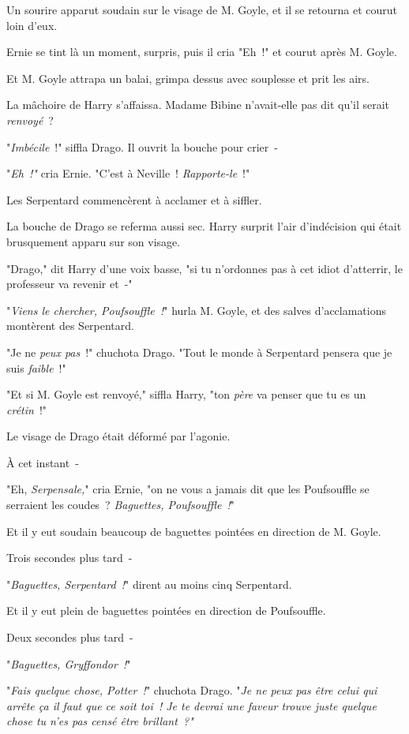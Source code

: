 Un sourire apparut soudain sur le visage de M. Goyle, et il se retourna et courut loin d'eux.

Ernie se tint là un moment, surpris, puis il cria "Eh~!" et courut après M. Goyle.

Et M. Goyle attrapa un balai, grimpa dessus avec souplesse et prit les airs.

La mâchoire de Harry s'affaissa. Madame Bibine n'avait-elle pas dit qu'il serait \emph{renvoyé}~?

"\emph{Imbécile}~!" siffla Drago. Il ouvrit la bouche pour crier~-

"\emph{Eh~!"} cria Ernie. "C'est à Neville~! \emph{Rapporte-le}~!"

Les Serpentard commencèrent à acclamer et à siffler.

La bouche de Drago se referma aussi sec. Harry surprit l'air d'indécision qui était brusquement apparu sur son visage.

"Drago," dit Harry d'une voix basse, "si tu n'ordonnes pas à cet idiot d'atterrir, le professeur va revenir et~-"

"\emph{Viens le chercher, Poufsouffle~!}" hurla M. Goyle, et des salves d'acclamations montèrent des Serpentard.

"Je ne \emph{peux pas}~!" chuchota Drago. "Tout le monde à Serpentard pensera que je suis \emph{faible}~!"

"Et si M. Goyle est renvoyé," siffla Harry, "ton \emph{père} va penser que tu es un \emph{crétin}~!"

Le visage de Drago était déformé par l'agonie.

À cet instant~-

"Eh, \emph{Serpensale,}" cria Ernie, "on ne vous a jamais dit que les Poufsouffle se serraient les coudes~? \emph{Baguettes, Poufsouffle~!}"

Et il y eut soudain beaucoup de baguettes pointées en direction de M. Goyle.

Trois secondes plus tard~-

"\emph{Baguettes, Serpentard~!}" dirent au moins cinq Serpentard.

Et il y eut plein de baguettes pointées en direction de Poufsouffle.

Deux secondes plus tard~-

"\emph{Baguettes, Gryffondor~!}"

"\emph{Fais quelque chose, Potter~!}" chuchota Drago. "\emph{Je ne peux pas être celui qui arrête ça il faut que ce soit toi~! Je te devrai une faveur trouve juste quelque chose tu n'es pas censé être brillant~?"}

